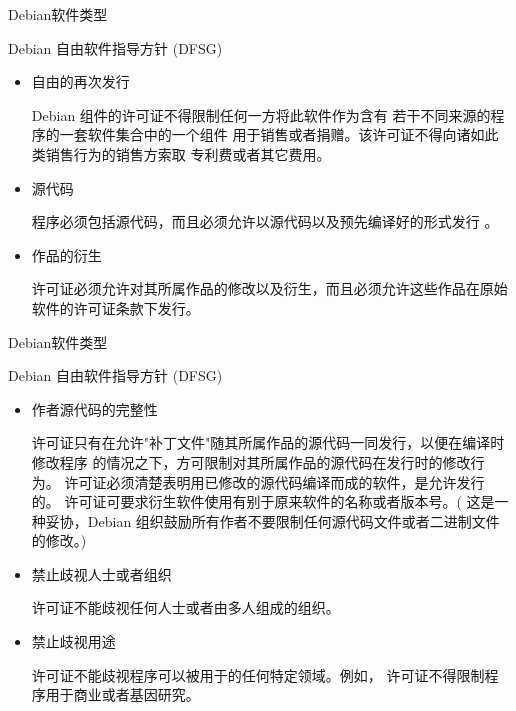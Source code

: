 \documentclass{beamer}
\begin{document}
\begin{frame}[t]{Debian软件类型}
    \begin{block}
        \scriptsize
        {Debian 自由软件指导方针 (DFSG)}
\begin{itemize}
    \item 自由的再次发行

    Debian 组件的许可证不得限制任何一方将此软件作为含有 若干不同来源的程序的一套软件集合中的一个组件 用于销售或者捐赠。该许可证不得向诸如此类销售行为的销售方索取 专利费或者其它费用。

    \item 源代码

    程序必须包括源代码，而且必须允许以源代码以及预先编译好的形式发行 。

\item 作品的衍生

    许可证必须允许对其所属作品的修改以及衍生，而且必须允许这些作品在原始 软件的许可证条款下发行。
\end{itemize}
\end{block}
\end{frame}
\begin{frame}[t]{Debian软件类型}
    \begin{block}
        \scriptsize
        {Debian 自由软件指导方针 (DFSG)}
\begin{itemize}

\item 作者源代码的完整性

    许可证只有在允许"补丁文件"随其所属作品的源代码一同发行，以便在编译时修改程序 的情况之下，方可限制对其所属作品的源代码在发行时的修改行为。 许可证必须清楚表明用已修改的源代码编译而成的软件，是允许发行的。 许可证可要求衍生软件使用有别于原来软件的名称或者版本号。( 这是一种妥协，Debian 组织鼓励所有作者不要限制任何源代码文件或者二进制文件的修改。)

\item 禁止歧视人士或者组织

    许可证不能歧视任何人士或者由多人组成的组织。

\item 禁止歧视用途

    许可证不能歧视程序可以被用于的任何特定领域。例如， 许可证不得限制程序用于商业或者基因研究。
\end{itemize}
\end{block}
\end{frame}
\end{document}
